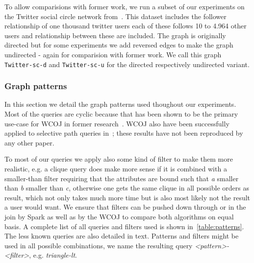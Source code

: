 To allow comparisions with former work, we run a subset of our experiments on the Twitter social circle network from~\cite{snapnets}.
This dataset includes the follower relationship of one thousand twitter users each of these follows 10 to 4.964 other users and relationship between these are included.
The graph is originally directed but for some experiments we add reversed edges to make the graph undirected - again for comparision with former work.
We call this graph \texttt{Twitter-sc-d} and \texttt{Twitter-sc-u} for the directed respectively undirected variant.

\subsubsection{Graph patterns}

In this section we detail the graph patterns used thoughout our experiments.
Most of the queries are cyclic because that has been shown to be the primary use-case for WCOJ in former research~\cite{olddog,myria-detailed}.
WCOJ also have been successfully applied to selective path queries in~\cite{olddog}; these results have not been reproduced by any other paper.

To most of our queries we apply also some kind of filter to make them more realistic, e.g. a clique query does make more sense if it is combined with a
smaller-than filter requiring that the attributes are bound such that \textit{a} smaller than \textit{b} smaller than \textit{c}, otherwise
one gets the same clique in all possible orders as result, which not only takes much more time but is also most likely not the result a user would want.
We ensure that filters can be pushed down through or in the join by Spark as well as by the WCOJ to compare both algorithms on equal basis.
A complete list of all queries and filters used is shown in~\cref{table:patterns}.
The less known queries are also detailed in text.
Patterns and filters might be used in all possible combinations, we name the resulting query \textit{\textless pattern\textgreater-\textless filter\textgreater}, e.g. \textit{triangle-lt}.

